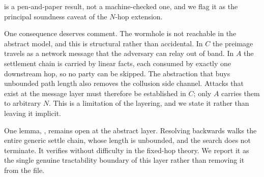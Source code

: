  is a pen-and-paper result, not a machine-checked one, and
we flag it as the principal soundness caveat of the $N$-hop extension.

One consequence deserves comment. The wormhole is not reachable in the abstract
model, and this is structural rather than accidental. In $C$ the preimage
travels as a network message that the adversary can relay out of band. In $A$
the settlement chain is carried by linear  facts, each
consumed by exactly one downstream hop, so no party can be skipped. The
abstraction that buys unbounded path length also removes the collusion side
channel. Attacks that exist at the message layer must therefore be established
in $C$; only $A$ carries them to arbitrary $N$. This is a limitation of the
layering, and we state it rather than leaving it implicit.

One lemma, , remains open at the
abstract layer. Resolving  backwards walks the entire
generic settle chain, whose length is unbounded, and the search does not
terminate. It verifies without difficulty in the fixed-hop theory. We report it
as the single genuine tractability boundary of this layer rather than removing
it from the file.
